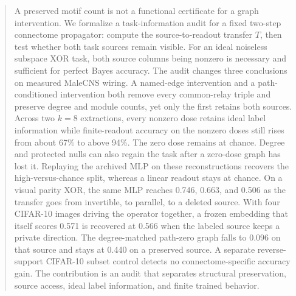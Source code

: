 \begin{abstract}
A preserved motif count is not a functional certificate for a graph intervention.
We formalize a task-information audit for a fixed two-step connectome propagator:
compute the source-to-readout transfer $T$, then test whether both task sources
remain visible. For an ideal noiseless subspace XOR task, both source columns
being nonzero is necessary and sufficient for perfect Bayes accuracy. The audit
changes three conclusions on measured MaleCNS wiring. A named-edge intervention
and a path-conditioned intervention both remove every common-relay triple and
preserve degree and module counts, yet only the first retains both sources.
Across two $k=8$ extractions, every nonzero dose retains ideal label information
while finite-readout accuracy on the nonzero doses still rises from about 67\% to above 94\%. The zero dose remains at chance. Degree and
protected nulls can also regain the task after a zero-dose graph has lost it.
Replaying the archived MLP on these reconstructions recovers the high-versus-chance split, whereas a linear readout stays at chance. On a visual parity XOR, the same MLP reaches 0.746, 0.663, and 0.506 as the transfer goes from invertible, to parallel, to a deleted source. With four CIFAR-10 images driving the operator together, a frozen embedding that itself scores 0.571 is recovered at 0.566 when the labeled source keeps a private direction. The degree-matched path-zero graph falls to 0.096 on that source and stays at 0.440 on a preserved source. A separate reverse-support CIFAR-10 subset control detects no connectome-specific
accuracy gain. The contribution is an audit that separates structural
preservation, source access, ideal label information, and finite trained behavior.
\end{abstract}
